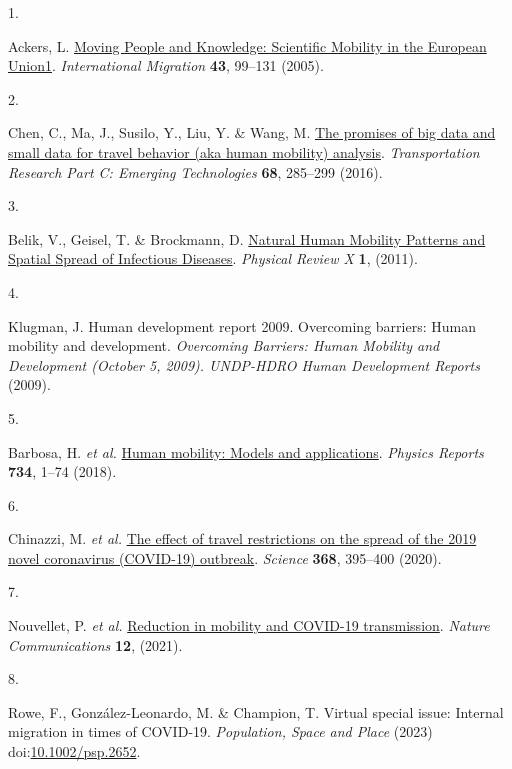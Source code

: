 \documentclass[
  11pt,
]{article}
\newlength{\cslhangindent}
\newlength{\csllabelwidth}
\newenvironment{CSLReferences}[2] %
 {\begin{list}{}{%
  \setlength{\itemindent}{0pt}
  \setlength{\leftmargin}{0pt}
  \setlength{\parsep}{0pt}
  \ifodd #1
   \setlength{\leftmargin}{\cslhangindent}
   \setlength{\itemindent}{-1\cslhangindent}
  \fi
  \setlength{\itemsep}{#2\baselineskip}}}
 {\end{list}}
\newcommand{\CSLLeftMargin}[1]{\parbox[t]{\csllabelwidth}{\strut#1\strut}}
\newcommand{\CSLRightInline}[1]{\parbox[t]{\linewidth - \csllabelwidth}{\strut#1\strut}}
\begin{document}
\label{refs}
\begin{CSLReferences}{0}{0}
\CSLLeftMargin{1. }%
\CSLRightInline{Ackers, L.
\href{https://doi.org/10.1111/j.1468-2435.2005.00343.x}{Moving People
and Knowledge: Scientific Mobility in the European Union1}.
\emph{International Migration} \textbf{43}, 99--131 (2005).}

\CSLLeftMargin{2. }%
\CSLRightInline{Chen, C., Ma, J., Susilo, Y., Liu, Y. \& Wang, M.
\href{https://doi.org/10.1016/j.trc.2016.04.005}{The promises of big
data and small data for travel behavior (aka human mobility) analysis}.
\emph{Transportation Research Part C: Emerging Technologies}
\textbf{68}, 285--299 (2016).}

\CSLLeftMargin{3. }%
\CSLRightInline{Belik, V., Geisel, T. \& Brockmann, D.
\href{https://doi.org/10.1103/physrevx.1.011001}{Natural Human Mobility
Patterns and Spatial Spread of Infectious Diseases}. \emph{Physical
Review X} \textbf{1}, (2011).}

\CSLLeftMargin{4. }%
\CSLRightInline{Klugman, J. Human development report 2009. Overcoming
barriers: Human mobility and development. \emph{Overcoming Barriers:
Human Mobility and Development (October 5, 2009). UNDP-HDRO Human
Development Reports} (2009).}

\CSLLeftMargin{5. }%
\CSLRightInline{Barbosa, H. \emph{et al.}
\href{https://doi.org/10.1016/j.physrep.2018.01.001}{Human mobility:
Models and applications}. \emph{Physics Reports} \textbf{734}, 1--74
(2018).}

\CSLLeftMargin{6. }%
\CSLRightInline{Chinazzi, M. \emph{et al.}
\href{https://doi.org/10.1126/science.aba9757}{The effect of travel
restrictions on the spread of the 2019 novel coronavirus (COVID-19)
outbreak}. \emph{Science} \textbf{368}, 395--400 (2020).}

\CSLLeftMargin{7. }%
\CSLRightInline{Nouvellet, P. \emph{et al.}
\href{https://doi.org/10.1038/s41467-021-21358-2}{Reduction in mobility
and COVID-19 transmission}. \emph{Nature Communications} \textbf{12},
(2021).}

\CSLLeftMargin{8. }%
\CSLRightInline{Rowe, F., González-Leonardo, M. \& Champion, T. Virtual
special issue: Internal migration in times of COVID{-}19.
\emph{Population, Space and Place} (2023)
doi:\href{https://doi.org/10.1002/psp.2652}{10.1002/psp.2652}.}


\end{CSLReferences}
\end{document}
